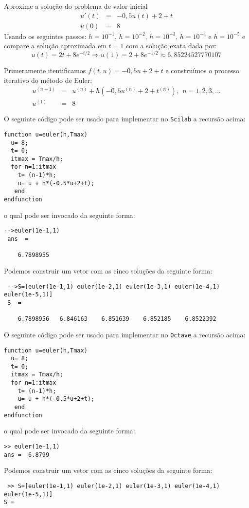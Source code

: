 \begin{exeresol}\label{exeresol:exeresol1} Aproxime a solução do problema de valor inicial
\begin{eqnarray}
     u'(t)&=& -0,5u(t)+2+t\\
            u(0) &=&  8
\end{eqnarray}
Usando os seguintes passos: $h=10^{-1}$, $h=10^{-2}$, $h=10^{-3}$, $h=10^{-4}$ e $h=10^{-5}$ e compare a solução aproximada em $t=1$ com a solução exata dada por:
\begin{equation}
     u(t) = 2t+8e^{-t/2} \Longrightarrow u(1)=2+8e^{-1/2} \approx 6,85224527770107
\end{equation}
\end{exeresol}
\begin{resol} Primeramente itentificamos $f(t,u)=-0,5u+2+t$ e construímos o processo iterativo do método de Euler:
\begin{eqnarray}
  u^{(n+1)}&=&u^{(n)} + h( -0,5u^{(n)}+2+t^{(n)}),~~n=1,2,3,\ldots\\
  u^{(1)}&=&8
\end{eqnarray}

\ifisscilab
O seguinte código pode ser usado para implementar no \verb+Scilab+ a recursão acima:
\begin{verbatim}
function u=euler(h,Tmax)
  u= 8;
  t= 0;
  itmax = Tmax/h;
  for n=1:itmax
    t= (n-1)*h;
    u= u + h*(-0.5*u+2+t);
   end
endfunction
\end{verbatim}
o qual pode ser invocado da seguinte forma:
\begin{verbatim}
-->euler(1e-1,1)
 ans  =

    6.7898955
\end{verbatim}
Podemos construir um vetor com as cinco soluções da seguinte forma:
\begin{verbatim}
 -->S=[euler(1e-1,1) euler(1e-2,1) euler(1e-3,1) euler(1e-4,1) euler(1e-5,1)]
 S  =

    6.7898956   6.846163    6.851639    6.852185    6.8522392
\end{verbatim}

\fi

\ifisoctave
O seguinte código pode ser usado para implementar no \verb+Octave+ a recursão acima:
\begin{verbatim}
function u=euler(h,Tmax)
  u= 8;
  t= 0;
  itmax = Tmax/h;
  for n=1:itmax
    t= (n-1)*h;
    u= u + h*(-0.5*u+2+t);
   end
endfunction
\end{verbatim}
o qual pode ser invocado da seguinte forma:
\begin{verbatim}
>> euler(1e-1,1)
ans =  6.8799
\end{verbatim}
Podemos construir um vetor com as cinco soluções da seguinte forma:
\begin{verbatim}
 >> S=[euler(1e-1,1) euler(1e-2,1) euler(1e-3,1) euler(1e-4,1) euler(1e-5,1)]
S =


\end{verbatim}
\end{resol}
